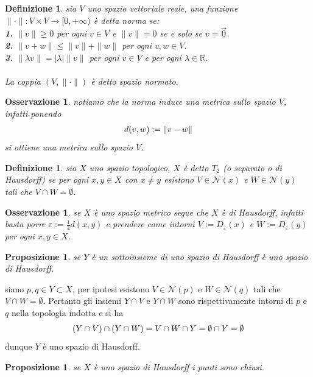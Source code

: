 \documentclass[oneside, 11pt]{amsbook}
\makeatletter
\newcommand{\0}{{(0)}}
\newcommand{\3}{{(3)}}
\theoremstyle{colonplain}
\newtheorem{prop}[thm]{Proposizione}
\theoremstyle{colondefinition}
\newtheorem{defn}[thm]{Definizione}
\theoremstyle{colonremark}
\newtheorem{rmk}[thm]{Osservazione}
\numberwithin{equation}{chapter}
\renewcommand{\proofname}{Dimostrazione}
\renewenvironment{proof}[1][\proofname]{\par
  \pushQED{\qed}%
  \normalfont \topsep6\p@\@plus6\p@\relax
  \trivlist
  \item[\hskip\labelsep\bfseries #1:]\ignorespaces
}{%
  \popQED\endtrivlist\@endpefalse
}
\makeatother
\begin{document}
\begin{defn}
sia $V$ uno spazio vettoriale reale, una funzione $\| \cdot \| : V \times V \longrightarrow [0, +\infty)$ è detta \textit{norma} se: \\
\textbf{1.} $\| v \| \geq 0$ per ogni $v \in V$ e $\| v \| = 0$ se e solo se $v = \vec{0}$. \\
\textbf{2.} $\| v + w \| \leq \| v \| + \| w \|$ per ogni $v, w \in V$. \\
\textbf{3.} $\| \lambda v \| = |\lambda| \| v \|$ per ogni $v \in V$ e per ogni $\lambda \in \mathbb{R}$. \\ \\
La coppia $(V, \| \cdot \|)$ è detto \textit{spazio normato}.
\end{defn}
\begin{rmk}
notiamo che la norma induce una metrica sullo spazio $V$, infatti ponendo
\begin{align}
    d(v, w) := \|v - w\| \notag
\end{align}
si ottiene una metrica sullo spazio $V$.
\end{rmk}
\begin{defn}
sia $X$ uno spazio topologico, $X$ è detto $T_2$ (o \textit{separato} o \textit{di Hausdorff}) se per ogni $x, y \in X$ con $x \neq y$ esistono $V \in \mathcal{N}(x)$ e $W \in \mathcal{N}(y)$ tali che $V \cap W = \emptyset$.
\end{defn}
\begin{rmk}
se $X$ è uno spazio metrico segue che $X$ è di Hausdorff, infatti basta porre $\varepsilon := \frac{1}{4}d(x, y)$ e prendere come intorni $V := D_\varepsilon(x)$ e $W := D_\varepsilon(y)$ per ogni $x, y \in X$.
\end{rmk}
\begin{prop}
se $Y$ è un sottoinsieme di uno spazio di Hausdorff è uno spazio di Hausdorff.
\end{prop}
\begin{proof}
siano $p, q \in Y \subset X$, per ipotesi esistono $V \in \mathcal{N}(p)$ e $W \in \mathcal{N}(q)$ tali che $V \cap W = \emptyset$. Pertanto gli insiemi $Y \cap V$ e $Y \cap W$ sono rispettivamente intorni di $p$ e $q$ nella topologia indotta e si ha
\begin{align}
    (Y \cap V) \cap (Y \cap W) = V \cap W \cap Y = \emptyset \cap Y = \emptyset \notag
\end{align}
dunque $Y$ è uno spazio di Hausdorff.
\end{proof}
\begin{prop}
se $X$ è uno spazio di Hausdorff i punti sono chiusi.
\end{prop}
\end{document}
